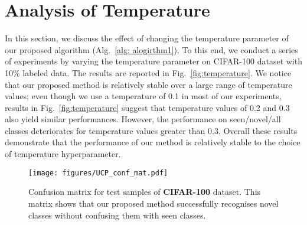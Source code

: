 \documentclass[runningheads]{eccv2022submission}
\begin{document}
\begin{figure*}
\captionsetup[subfloat]{labelformat=empty}
\centering
\vspace{-4mm}
    \caption{Accuracy on \textbf{CIFAR-100} dataset with different temperature values. These graphs suggest that our proposed method is not sensitive to change of temperature parameter over a large interval of temperature values.}
    \label{fig:temperature}
\end{figure*}



\section{Analysis of Temperature}
\label{sec:temp}
In this section, we discuss the effect of changing the temperature parameter of our proposed algorithm (Alg.~\ref{alg: alogirthm1}). To this end, we conduct a series of experiments by varying the temperature parameter on CIFAR-100 dataset with 10\% labeled data. The results are reported in Fig.~\ref{fig:temperature}. We notice that our proposed method is relatively stable over a large range of temperature values; even though we use a temperature of 0.1 in most of our experiments, results in Fig.~\ref{fig:temperature} suggest that temperature values of 0.2 and 0.3 also yield similar performances. However, the performance on seen/novel/all classes deteriorates for temperature values greater than 0.3. Overall these results demonstrate that the performance of our method is relatively stable to the choice of temperature hyperparameter. 

\begin{figure}[h]
\begin{center}
\texttt{[image: figures/UCP\_conf\_mat.pdf]}
\caption{Confusion matrix for test samples of \textbf{CIFAR-100} dataset. This matrix shows that our proposed method successfully recognises novel classes without confusing them with seen classes.}
\label{fig:confusion}
\end{center}
\end{figure}
\end{document}
